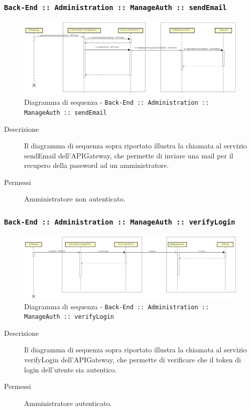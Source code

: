 \documentclass[../DefinizioneDiProdotto_v2.0.0.tex]{subfiles}
\begin{document}
\newpage
\subsubsection{\texttt{Back-End :: Administration :: ManageAuth :: sendEmail}}
\begin{figure}[!h]
	\centering
	\includegraphics[scale=0.3]{DiagrammiSequenza/Back-End/manageAuth/sendEmail.png}
	\caption{Diagramma di sequenza - \texttt{Back-End :: Administration :: ManageAuth :: sendEmail }}
\end{figure}
\begin{description}
	\item [Descrizione] Il diagramma di sequenza sopra riportato illustra la chiamata al servizio sendEmail dell'APIGateway, che permette di inviare una mail per il recupero della password ad un amministratore.
	\item [Permessi] Amministratore non autenticato.
\end{description}

\subsubsection{\texttt{Back-End :: Administration :: ManageAuth :: verifyLogin}}
\begin{figure}[!h]
	\centering
	\includegraphics[scale=0.3]{DiagrammiSequenza/Back-End/manageAuth/verifyLogin.png}
	\caption{Diagramma di sequenza - \texttt{Back-End :: Administration :: ManageAuth :: verifyLogin }}
\end{figure}
\begin{description}
	\item [Descrizione] Il diagramma di sequenza sopra riportato illustra la chiamata al servizio verifyLogin dell'APIGateway, che permette di verificare che il token di login dell'utente sia autentico.
	\item [Permessi] Amministratore autenticato.
\end{description}
\end{document}
